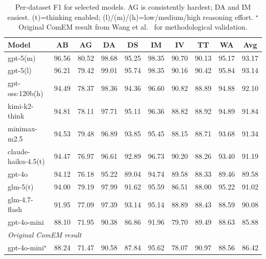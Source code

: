 \documentclass[runningheads]{llncs}
\begin{document}
\begin{table}[htbp]
\centering
\caption{Per-dataset F1 for selected models. AG is consistently hardest; DA and IM easiest. (t)=thinking enabled; (l)/(m)/(h)=low/medium/high reasoning effort.
$^\star$Original ComEM result from Wang et al.~\cite{wang2025match} for methodological validation.}
\label{tab:per_dataset}
\setlength{\tabcolsep}{1.5pt}
\tiny
\begin{tabular}{lccccccccc}
\toprule
\textbf{Model} & \textbf{AB} & \textbf{AG} & \textbf{DA} & \textbf{DS} & \textbf{IM} & \textbf{IV} & \textbf{TT} & \textbf{WA} & \textbf{Avg} \\
\midrule
gpt-5(m) & 96.56 & 80.52 & 98.68 & 95.25 & 98.35 & 90.70 & 90.13 & 95.17 & 93.17 \\
gpt-5(l) & 96.21 & 79.42 & 99.01 & 95.74 & 98.35 & 90.16 & 90.42 & 95.84 & 93.14 \\
gpt-oss:120b(h) & 94.49 & 78.37 & 98.36 & 94.36 & 96.60 & 90.82 & 88.89 & 94.88 & 92.10 \\
kimi-k2-think & 94.81 & 78.11 & 97.71 & 95.11 & 96.36 & 88.82 & 88.92 & 94.89 & 91.84 \\
minimax-m2.5 & 94.53 & 79.48 & 96.89 & 93.85 & 95.45 & 88.15 & 88.71 & 93.68 & 91.34 \\
claude-haiku-4.5(t) & 94.47 & 76.97 & 96.61 & 92.89 & 96.73 & 90.20 & 88.26 & 93.40 & 91.19 \\
gpt-4o & 94.12 & 76.18 & 95.22 & 89.04 & 94.74 & 89.58 & 88.33 & 89.46 & 89.58 \\
glm-5(t) & 94.00 & 79.19 & 97.99 & 91.62 & 95.59 & 86.51 & 88.00 & 95.22 & 91.02 \\
glm-4.7-flash & 91.95 & 77.09 & 97.39 & 93.14 & 95.14 & 88.89 & 88.43 & 88.59 & 90.08 \\
gpt-4o-mini & 88.10 & 71.95 & 90.38 & 86.86 & 91.96 & 79.70 & 89.49 & 88.63 & 85.88 \\
\midrule
\multicolumn{10}{l}{\emph{Original ComEM result~\cite{wang2025match}}} \\
\midrule
gpt-4o-mini$^\star$ & 88.24 & 71.47 & 90.58 & 87.84 & 95.62 & 78.07 & 90.97 & 88.56 & 86.42 \\
\bottomrule
\end{tabular}
\end{table}
\end{document}
